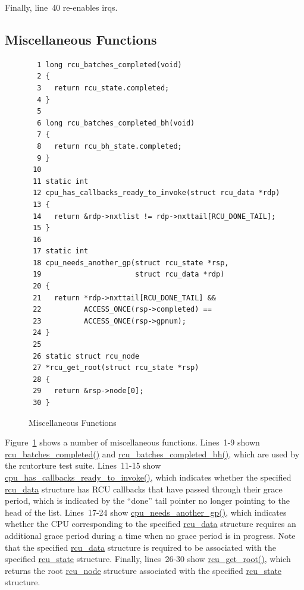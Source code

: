  \QuickQuizEnd

Finally, line~40 re-enables irqs.

\subsection{Miscellaneous Functions}
\label{app:rcuimpl:rcutreewt:Miscellaneous Functions}

\begin{figure}[tbp]
{ \scriptsize
\begin{verbatim}
  1 long rcu_batches_completed(void)
  2 {
  3   return rcu_state.completed;
  4 }
  5 
  6 long rcu_batches_completed_bh(void)
  7 {
  8   return rcu_bh_state.completed;
  9 }
 10 
 11 static int
 12 cpu_has_callbacks_ready_to_invoke(struct rcu_data *rdp)
 13 {
 14   return &rdp->nxtlist != rdp->nxttail[RCU_DONE_TAIL];
 15 }
 16 
 17 static int
 18 cpu_needs_another_gp(struct rcu_state *rsp,
 19                      struct rcu_data *rdp)
 20 {
 21   return *rdp->nxttail[RCU_DONE_TAIL] &&
 22          ACCESS_ONCE(rsp->completed) ==
 23          ACCESS_ONCE(rsp->gpnum);
 24 }
 25 
 26 static struct rcu_node
 27 *rcu_get_root(struct rcu_state *rsp)
 28 {
 29   return &rsp->node[0];
 30 }
\end{verbatim}
}
\caption{Miscellaneous Functions}
\label{fig:app:rcuimpl:rcutreewt:Miscellaneous Functions}
\end{figure}

Figure~\ref{fig:app:rcuimpl:rcutreewt:Miscellaneous Functions}
shows a number of miscellaneous functions.
Lines~1-9 shown \url{rcu_batches_completed()} and
\url{rcu_batches_completed_bh()}, which are used by the rcutorture
test suite.
Lines~11-15 show \url{cpu_has_callbacks_ready_to_invoke()}, which
indicates whether the specified \url{rcu_data} structure has RCU
callbacks that have passed through their grace period, which
is indicated by the ``done'' tail pointer no longer pointing
to the head of the list.
Lines~17-24 show \url{cpu_needs_another_gp()}, which indicates
whether the CPU corresponding to the specified \url{rcu_data}
structure requires an additional grace period during a time when
no grace period is in progress.
Note that the specified \url{rcu_data} structure is required
to be associated with the specified \url{rcu_state} structure.
Finally, lines~26-30 show \url{rcu_get_root()}, which returns
the root \url{rcu_node} structure associated with the specified
\url{rcu_state} structure.

